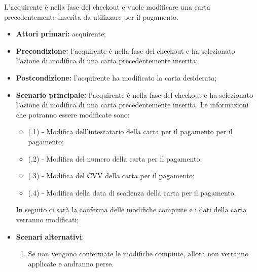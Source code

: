 L'acquirente è nella fase del checkout e vuole modificare una carta precedentemente inserita da utilizzare per il pagamento.
\begin{itemize}
    \item \textbf{Attori primari:} acquirente;
    \item \textbf{Precondizione:} l'acquirente è nella fase del checkout e ha selezionato l'azione di modifica di una carta precedentemente inserita;
    \item \textbf{Postcondizione:} l'acquirente ha modificato la carta desiderata;
    \item \textbf{Scenario principale:} l'acquirente è nella fase del checkout e ha selezionato l'azione di modifica di una carta precedentemente inserita. Le informazioni che potranno essere modificate sono:
    \begin{itemize}
        \item (\actualUC.1) - Modifica dell'intestatario della carta per il pagamento per il pagamento;
        \item (\actualUC.2) - Modifica del numero della carta per il pagamento;
        \item (\actualUC.3) - Modifica del CVV della carta per il pagamento;
        \item (\actualUC.4) - Modifica della data di scadenza della carta per il pagamento.
    \end{itemize}
    In seguito ci sarà la conferma delle modifiche compiute e i dati della carta verranno modificati;
    \item \textbf{Scenari alternativi}:
    \begin{enumerate}[label=\lett]
        \item Se non vengono confermate le modifiche compiute, allora non verranno applicate e andranno perse.
    \end{enumerate}
\end{itemize}

\resetSubUC

